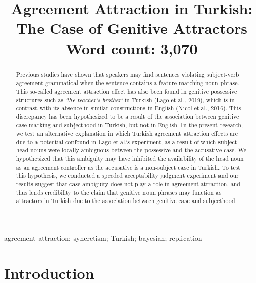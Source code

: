 \documentclass[apacite,linguex]{glossa}\usepackage[]{graphicx}\usepackage[]{color}
\title[Agreement Attraction in Turkish]{Agreement Attraction in Turkish: The Case of Genitive Attractors\\ \bigskip \large Word count: 3,070}
\author[\firstauthor \& \secondauthor]%
{%
  \spauthor{\texttt{Hidden Hidden (\firstauthor)}\\ 
  \institute{\texttt{Hidden University}}\\
  \small{
    \texttt{hidden@hidden.edu}}
  }
  \AND
  \spauthor{\texttt{Hidden Hidden (\secondauthor)}\\ 
  \institute{\texttt{Hidden University}}\\
  \small{
    \texttt{hidden@hidden.edu}}
  }%
}
\begin{document}
\sffamily
\maketitle


\begin{abstract}

Previous studies have shown that speakers may find sentences violating subject-verb agreement grammatical when the sentence contains a feature-matching noun phrase. 
%
This so-called agreement attraction effect has also been found in genitive possessive structures such as \textit{'the teacher's brother'} in Turkish (Lago et al., 2019), which is in contrast with its absence in similar constructions in English (Nicol et al., 2016). This discrepancy has been hypothesized to be a result of the association between genitive case marking and subjecthood in Turkish, but not in English.
%
In the present research, we test an alternative explanation in which Turkish agreement attraction effects are due to a potential confound in Lago et al.'s experiment, as a result of which subject head nouns were locally ambiguous between the possessive and the accusative case. We hypothesized that this ambiguity may have inhibited the availability of the head noun as an agreement controller as the accusative is a non-subject case in Turkish. To test this hypothesis, we conducted a speeded acceptability judgment experiment and our results suggest that case-ambiguity does not play a role in agreement attraction, and thus lends credibility to the claim that genitive noun phrases may function as attractors in Turkish due to the association between genitive case and subjecthood. 

\end{abstract}

\begin{keywords}
agreement attraction; syncretism; Turkish; bayesian; replication
\end{keywords}

\rmfamily



\section{Introduction}
\end{document}
